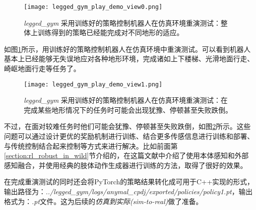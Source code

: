 \begin{figure}
    \centering
    \caption{\emph{legged\_gym} 采用训练好的策略控制机器人在仿真环境重演测试：整体上训练得到的策略已经能完成对不同地形的适应。}
    \label{fig:legged_gym_play_demo_view0}
    \texttt{[image: legged\_gym\_play\_demo\_view0.png]}
\end{figure}


如图\ref{fig:legged_gym_play_demo_view0}所示，用训练好的策略控制机器人在仿真环境中重演测试。可以看到机器人基本上已经能够无失误地应对各种地形环境，完成诸如上下楼梯、光滑地面行走、崎岖地面行走等任务了。

\begin{figure}
    \centering
    \caption{\emph{legged\_gym} 采用训练好的策略控制机器人在仿真环境重演测试：在完成某些地形情况下的任务时可能会出现犹豫、停顿甚至失败跌倒。}
    \label{fig:legged_gym_play_demo_view1}
    \texttt{[image: legged\_gym\_play\_demo\_view1.png]}
\end{figure}

不过，在面对较难任务时他们可能会犹豫、停顿甚至失败跌倒，如图\ref{fig:legged_gym_play_demo_view1}所示。这些问题可以通过设计更优的奖励机制进行训练、结合更多传感信息进行训练和部署、与传统控制结合起来控制等方式来进行解决。比如前面第\ref{section:rl_robust_in_wild}节介绍的，在这篇文献\cite[p4]{Miki_Lee_Hwangbo_Wellhausen_Koltun_Hutter_2022}中介绍了使用本体感知和外部感知融合，并使用经典的肢体动作生成器进行训练的方法，取得了很好的效果。

在完成重演测试的同时还会将PyTorch的策略结果转化成可用于C++实现的形式，输出路径为：\emph{../legged\_gym/logs/anymal\_cpdj/exported/policies/policy1.pt}，输出格式为：\emph{.pt}文件。这为后续的\emph{仿真到实际(sim-to-real)}做了准备。

